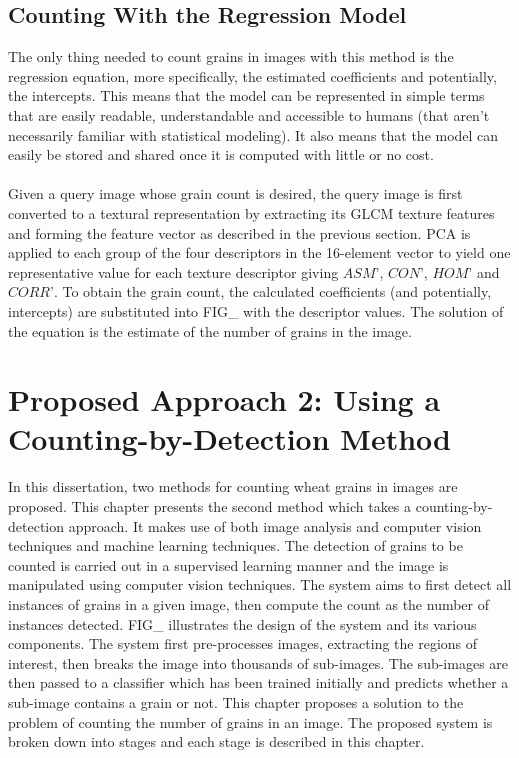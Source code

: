 \goodbreak
\section{Counting With the Regression Model}
The only thing needed to count grains in images with this method is the regression equation, more specifically, the estimated coefficients and potentially, the intercepts. This means that the model can be represented in simple terms that are easily readable, understandable and accessible to humans (that aren't necessarily familiar with statistical modeling). It also means that the model can easily be stored and shared once it is computed with little or no cost.\\ \\
%
Given a query image whose grain count is desired, the query image is first converted to a textural representation by extracting its GLCM texture features and forming the feature vector as described in the previous section. PCA is applied to each group of the four descriptors in the 16-element vector to yield one representative value for each texture descriptor giving $ASM\text{'}$, $CON\text{'}$, $HOM\text{'}$ and $CORR\text{'}$. To obtain the grain count, the calculated coefficients (and potentially, intercepts) are substituted into FIG\_ with the descriptor values. The solution of the equation is the estimate of the number of grains in the image. 
\bigskip



\def\baselinestretch{1}

\chapter{Proposed Approach 2: Using a Counting-by-Detection Method}
\def\baselinestretch{1.66}



In this dissertation, two methods for counting wheat grains in images are proposed. This chapter presents the second method which takes a counting-by-detection approach. It makes use of both image analysis and computer vision techniques and machine learning techniques. The detection of grains to be counted is carried out in a supervised learning manner and the image is manipulated using computer vision techniques. The system aims to first detect all instances of grains in a given image, then compute the count as the number of instances detected. FIG\_ illustrates the design of the system and its various components. The system first pre-processes images, extracting the regions of interest, then breaks the image into  thousands of sub-images. The sub-images are then passed to a classifier which has been trained initially and predicts whether a sub-image contains a grain or not. This chapter proposes a solution to the problem of counting the number of grains in an image. The proposed system is broken down into stages and each stage is described in this chapter.

